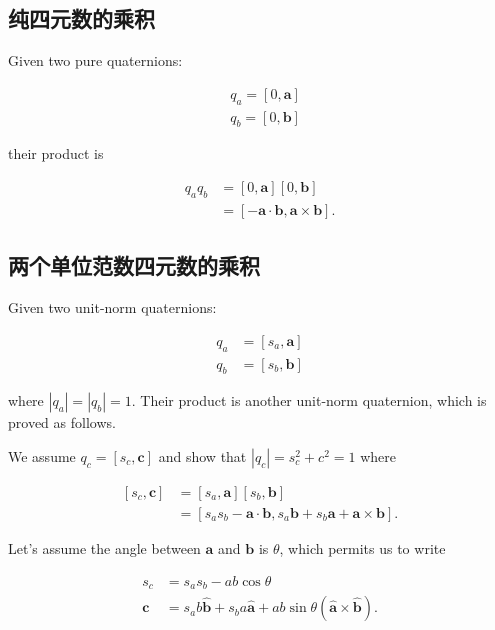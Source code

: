 \subsection{纯四元数的乘积}
Given two pure quaternions:

$$
\begin{aligned}
& q_{a}=[0, \mathbf{a}] \\
& q_{b}=[0, \mathbf{b}]
\end{aligned}
$$

their product is

$$
\begin{aligned}
q_{a} q_{b} & =[0, \mathbf{a}][0, \mathbf{b}] \\
& =[-\mathbf{a} \cdot \mathbf{b}, \mathbf{a} \times \mathbf{b}] .
\end{aligned}
$$

\subsection{两个单位范数四元数的乘积}
Given two unit-norm quaternions:

$$
\begin{aligned}
q_{a} & =\left[s_{a}, \mathbf{a}\right] \\
q_{b} & =\left[s_{b}, \mathbf{b}\right]
\end{aligned}
$$

where $\left|q_{a}\right|=\left|q_{b}\right|=1$. Their product is another unit-norm quaternion, which is proved as follows.

We assume $q_{c}=\left[s_{c}, \mathbf{c}\right]$ and show that $\left|q_{c}\right|=s_{c}^{2}+c^{2}=1$ where

$$
\begin{aligned}
{\left[s_{c}, \mathbf{c}\right] } & =\left[s_{a}, \mathbf{a}\right]\left[s_{b}, \mathbf{b}\right] \\
& =\left[s_{a} s_{b}-\mathbf{a} \cdot \mathbf{b}, s_{a} \mathbf{b}+s_{b} \mathbf{a}+\mathbf{a} \times \mathbf{b}\right] .
\end{aligned}
$$

Let's assume the angle between $\mathbf{a}$ and $\mathbf{b}$ is $\theta$, which permits us to write

$$
\begin{aligned}
s_{c} & =s_{a} s_{b}-a b \cos \theta \\
\mathbf{c} & =s_{a} b \hat{\mathbf{b}}+s_{b} a \hat{\mathbf{a}}+a b \sin \theta(\hat{\mathbf{a}} \times \hat{\mathbf{b}}) .
\end{aligned}
$$

